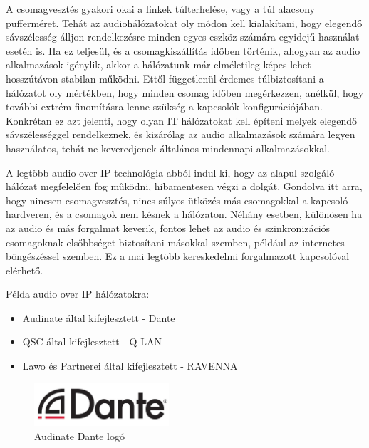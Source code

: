 A csomagvesztés gyakori okai a linkek túlterhelése, vagy a túl alacsony pufferméret.
Tehát az audiohálózatokat oly módon kell kialakítani, hogy elegendő sávszélesség álljon rendelkezésre
minden egyes eszköz számára egyidejű használat esetén is. 
Ha ez teljesül, és a csomagkiszállítás időben történik, ahogyan az audio alkalmazások igénylik,
akkor a hálózatunk már elméletileg képes lehet hosszútávon stabilan működni.
Ettől függetlenül érdemes túlbiztosítani a hálózatot oly mértékben, hogy minden csomag időben
megérkezzen, anélkül, hogy további extrém finomításra lenne szükség a kapcsolók
konfigurációjában. Konkrétan ez azt jelenti, hogy olyan IT hálózatokat kell
építeni melyek elegendő sávszélességgel rendelkeznek, és kizárólag az audio alkalmazások számára
legyen használatos, tehát ne keveredjenek általános mindennapi alkalmazásokkal.


A legtöbb audio-over-IP technológia abból indul ki, hogy az alapul szolgáló
hálózat megfelelően fog működni, hibamentesen végzi a dolgát. Gondolva itt arra, hogy nincsen csomagvesztés, 
nincs súlyos ütközés más csomagokkal a kapcsoló hardveren, és a csomagok nem késnek a hálózaton.
Néhány esetben, különösen ha az audio és más forgalmat keverik, 
fontos lehet az audio és szinkronizációs csomagoknak elsőbbséget biztosítani másokkal szemben,
például az internetes böngészéssel szemben. Ez a mai legtöbb kereskedelmi forgalmazott
kapcsolóval elérhető. \newline

Példa audio over IP hálózatokra:
\begin{itemize}
	\item Audinate által kifejlesztett - Dante
\end{itemize}
\begin{itemize}
	\item QSC által kifejlesztett - Q-LAN
\end{itemize}
\begin{itemize}
	\item Lawo és Partnerei által kifejlesztett - RAVENNA
\end{itemize}
\begin{figure}[H]
	\centering
	\includegraphics[width=50mm, keepaspectratio]{figures/dante_logo.jpg}
	\caption{Audinate Dante logó}
	\label {fig:dante_logo}
\end{figure}
